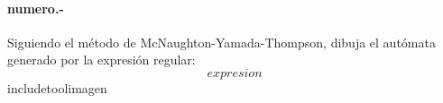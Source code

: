 
\paragraph{{numero}.-}\label{p{numero}}
Siguiendo el método de McNaughton-Yamada-Thompson, dibuja el autómata generado por la expresión regular:
\[
    {expresion}
\]
    {includetool}{{imagen}}
